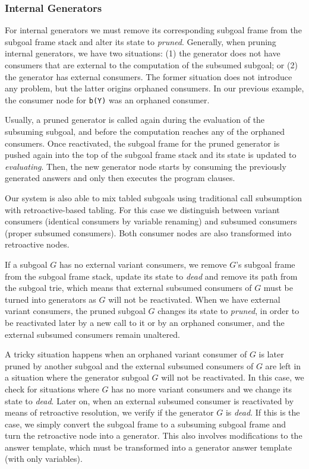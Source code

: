 \subsubsection{Internal Generators}

For internal generators we must remove its corresponding subgoal frame
from the subgoal frame stack and alter its state to \emph{pruned}. Generally, when pruning internal generators, we
have two situations: (1) the generator does not have consumers that are external to the computation of the
subsumed subgoal; or (2) the generator has external consumers. The former situation does not introduce any
problem, but the latter origins orphaned consumers. In our previous example, the consumer node for \texttt{b(Y)} was
an orphaned consumer.

Usually, a pruned generator is called again during the evaluation of the subsuming subgoal, and before
the computation reaches any of the orphaned consumers. Once reactivated, the subgoal frame for the pruned
generator is pushed again into the top of the subgoal frame stack and its state is updated to
\textit{evaluating}. Then, the new generator node starts by consuming the previously generated answers
and only then executes the program clauses.

Our system is also able to mix tabled subgoals using traditional call subsumption with retroactive-based tabling.
For this case we distinguish between variant consumers (identical consumers by variable renaming) and
subsumed consumers (proper subsumed consumers). Both consumer nodes are also transformed into retroactive
nodes.

If a subgoal $G$ has no external variant consumers, we remove $G$'s subgoal frame from the subgoal frame stack,
update its state to \emph{dead} and remove its path from the subgoal trie, which means that external subsumed
consumers of $G$ must be turned into generators as $G$ will not be reactivated.
When we have external variant consumers, the pruned subgoal $G$ changes its state
to \textit{pruned}, in order to be reactivated later by a new call to it or by an orphaned consumer, and
the external subsumed consumers remain unaltered.

A tricky situation happens when an orphaned variant consumer of $G$ is later pruned by another subgoal and the external
subsumed consumers of $G$ are left in a situation where the generator subgoal $G$ will not be reactivated. In this case,
we check for situations where $G$ has no more variant consumers and we change its state
to \textit{dead}. Later on, when an external subsumed consumer is reactivated by means of retroactive resolution, we
verify if the generator $G$ is \textit{dead}. If this is the case, we simply convert the subgoal frame to a
subsuming subgoal frame and turn the retroactive node into a generator. This also involves modifications
to the answer template, which must be transformed into a generator answer template (with only variables).

